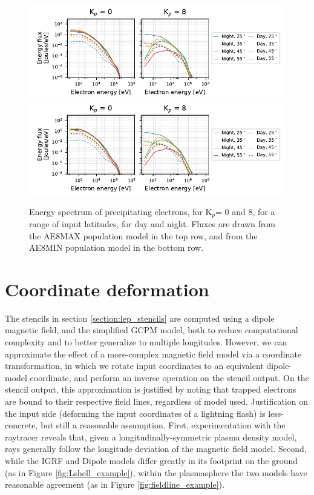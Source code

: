 \begin{figure}[t]
\begin{center}
\includegraphics[clip]{figures/stencil_energy_spectrum.pdf}
\includegraphics[clip]{figures/stencil_energy_spectrum_AE8MIN_flux_0.pdf}
\caption[Energy spectrum of LEP stencils]{Energy spectrum of precipitating electrons, for K$_p$= 0 and 8, for a range of input latitudes, for day and night. Fluxes are drawn from the AE8MAX population model in the top row, and from the AE8MIN population model in the bottom row.}
\label{fig:stencil_energy_spectrum}
\end{center}
\end{figure}


\section{Coordinate deformation}
The stencils in section \ref{section:lep_stencils} are computed using a dipole magnetic field, and the simplified GCPM model, both to reduce computational complexity and to better generalize to multiple longitudes. However, we can approximate the effect of a more-complex magnetic field model via a coordinate transformation, in which we rotate input coordinates to an equivalent dipole-model coordinate, and perform an inverse operation on the stencil output. On the stencil output, this approximation is justified by noting that trapped electrons are bound to their respective field lines, regardless of model used. Justification on the input side (deforming the input coordinates of a lightning flash) is less-concrete, but still a reasonable assumption. First, experimentation with the raytracer reveals that, given a longitudinally-symmetric plasma density model, rays generally follow the longitude deviation of the magnetic field model. Second, while the IGRF and Dipole models differ greatly in its footprint on the ground (as in Figure \ref{fig:Lshell_example}), within the plasmasphere the two models have reasonable agreement (as in Figure \ref{fig:fieldline_example}).

